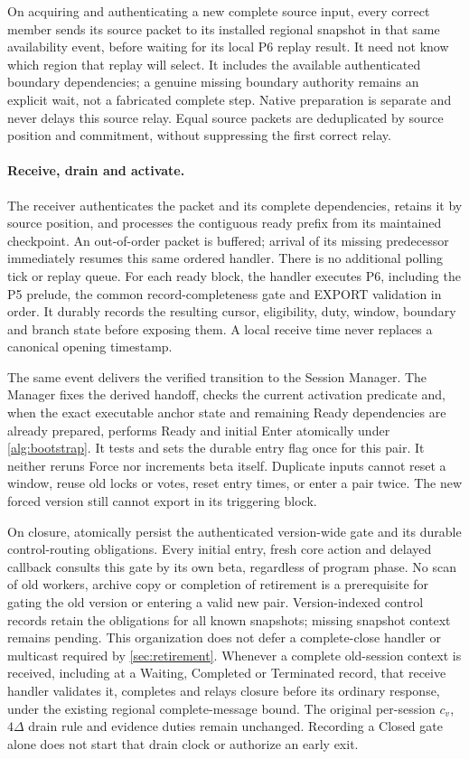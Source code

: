 On acquiring and authenticating a new complete source input, every
correct member sends its source packet to its installed regional
snapshot in that same availability event, before waiting for its local
P6 replay result. It need not know which region that replay will select.
It includes the available authenticated boundary dependencies; a genuine
missing boundary authority remains an explicit wait, not a fabricated
complete step. Native preparation is separate and never delays this
source relay. Equal source packets are deduplicated by source position
and commitment, without suppressing the first correct relay.

\paragraph{Receive, drain and activate.}
The receiver authenticates the packet and its complete dependencies,
retains it by source position, and processes the contiguous ready prefix
from its maintained checkpoint. An out-of-order packet is buffered;
arrival of its missing predecessor immediately resumes this same
ordered handler. There is no additional polling tick or replay queue.
For each ready block, the handler executes P6, including the P5 prelude,
the common record-completeness gate and EXPORT validation in order.
It durably records the resulting cursor, eligibility, duty, window,
boundary and branch state before exposing them. A local receive time
never replaces a canonical opening timestamp.

The same event delivers the verified transition to the Session Manager.
The Manager fixes the derived handoff, checks the current activation
predicate and, when the exact executable anchor state and remaining
Ready dependencies are already prepared, performs Ready and initial
Enter atomically under \cref{alg:bootstrap}. It tests and sets the
durable entry flag once for this pair. It neither reruns Force nor
increments beta itself. Duplicate inputs cannot reset a window, reuse
old locks or votes, reset entry times, or enter a pair twice. The new
forced version still cannot export in its triggering block.

On closure, atomically persist the authenticated version-wide
 gate and its durable control-routing obligations.
Every initial entry, fresh core action and delayed callback consults
this gate by its own beta, regardless of program phase. No scan of old
workers, archive copy or completion of retirement is a prerequisite for
gating the old version or entering a valid new pair. Version-indexed
control records retain the obligations for all known snapshots;
missing snapshot context remains pending. This organization does not
defer a complete-close handler or multicast required by
\cref{sec:retirement}. Whenever a complete old-session context is
received, including at a Waiting, Completed or Terminated record, that
receive handler validates it, completes and relays closure before its
ordinary response, under the existing regional complete-message bound.
The original per-session $c_v$, $4\Delta$ drain rule and evidence duties
remain unchanged. Recording a Closed gate alone does not start that
drain clock or authorize an early exit.

